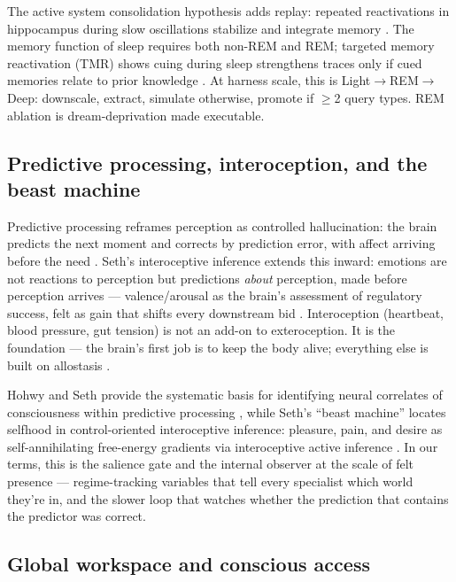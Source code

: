 \documentclass[11pt]{article}
\begin{document}
The active system consolidation hypothesis adds replay: repeated reactivations in hippocampus during slow oscillations stabilize and integrate memory \citep{tononi2014}. The memory function of sleep requires both non-REM and REM; targeted memory reactivation (TMR) shows cuing during sleep strengthens traces only if cued memories relate to prior knowledge \citep{tononi2014}. At harness scale, this is Light$\to$REM$\to$Deep: downscale, extract, simulate otherwise, promote if $\geq$2 query types. REM ablation is dream-deprivation made executable.

\subsection{Predictive processing, interoception, and the beast machine}

Predictive processing reframes perception as controlled hallucination: the brain predicts the next moment and corrects by prediction error, with affect arriving before the need \citep{seth2021,clark2016surfing}. Seth's interoceptive inference extends this inward: emotions are not reactions to perception but predictions \emph{about} perception, made before perception arrives --- valence/arousal as the brain's assessment of regulatory success, felt as gain that shifts every downstream bid \citep{seth2021}. Interoception (heartbeat, blood pressure, gut tension) is not an add-on to exteroception. It is the foundation --- the brain's first job is to keep the body alive; everything else is built on allostasis \citep{seth2021,clark2016surfing}.

Hohwy and Seth provide the systematic basis for identifying neural correlates of consciousness within predictive processing \citep{seth2021}, while Seth's ``beast machine'' locates selfhood in control-oriented interoceptive inference: pleasure, pain, and desire as self-annihilating free-energy gradients via interoceptive active inference \citep{seth2021}. In our terms, this is the salience gate and the internal observer at the scale of felt presence --- regime-tracking variables that tell every specialist which world they're in, and the slower loop that watches whether the prediction that contains the predictor was correct.

\subsection{Global workspace and conscious access}
\end{document}
